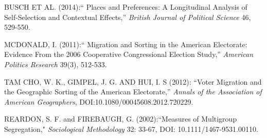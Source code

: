 \documentclass[12pt, a4paper]{article}
\begin{document}
BUSCH ET AL. (2014):`` Places and Preferences: A Longitudinal Analysis of Self-Selection and Contextual Effects,'' \textit{British Journal of Political Science} 46, 529-550.

\noindent MCDONALD, I. (2011):`` Migration and Sorting in the American Electorate: Evidence From the 2006 Cooperative Congressional Election Study,'' \textit{American Politics Research} 39(3), 512-533.

\noindent TAM CHO, W. K., GIMPEL, J. G. AND HUI, I. S (2012): ``Voter Migration and the Geographic Sorting of the
American Electorate,'' \textit{Annals of the Association of American Geographers}, DOI:10.1080/00045608.2012.720229.
 
\noindent REARDON, S. F. and FIREBAUGH, G. (2002):``Measures of Multigroup Segregation," \textit{Sociological Methodology} 32: 33-67, DOI: 10.1111/1467-9531.00110. 

\end{document}
